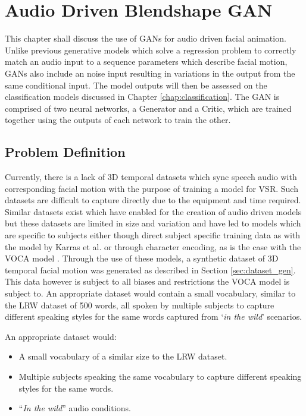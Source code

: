 


\chapter{Audio Driven Blendshape GAN}
This chapter shall discuss the use of GANs for audio driven facial animation.
Unlike previous generative models which solve a regression problem to correctly match an audio input to a sequence parameters which describe facial motion, GANs also include an noise input resulting in variations in the output from the same conditional input.
The model outputs will then be assessed on the classification models discussed in Chapter \ref{chap:classification}.
The GAN is comprised of two neural networks, a Generator and a Critic, which are trained together using the outputs of each network to train the other.

\section{Problem Definition}
Currently, there is a lack of 3D temporal datasets which sync speech audio with corresponding facial motion with the purpose of training a model for VSR.
Such datasets are difficult to capture directly due to the equipment and time required.
Similar datasets exist which have enabled for the creation of audio driven models but these datasets are limited in size and variation and have led to models which are specific to subjects either though direct subject specific training data as with the model by Karras et al. \cite{Karras2017a} or through character encoding, as is the case with the VOCA model \cite{Cudeiro2019}.
Through the use of these models, a synthetic dataset of 3D temporal facial motion was generated as described in Section \ref{sec:dataset_gen}.
This data however is subject to all biases and restrictions the VOCA model is subject to.
An appropriate dataset would contain a small vocabulary, similar to the LRW dataset of 500 words, all spoken by multiple subjects to capture different speaking styles for the same words captured from `\textit{in the wild}' scenarios.

An appropriate dataset would:
\begin{itemize}
    \item A small vocabulary of a similar size to the LRW dataset.
    \item Multiple subjects speaking the same vocabulary to capture different speaking styles for the same words.
    \item ``\textit{In the wild}'' audio conditions.
\end{itemize}

